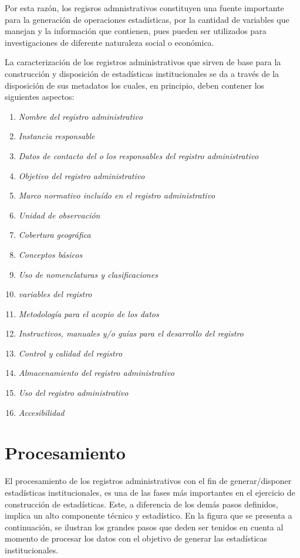 \documentclass[
]{book}
\providecommand{\tightlist}{%
  \setlength{\itemsep}{0pt}\setlength{\parskip}{0pt}}
\begin{document}
Por esta razón, los regisros admnistrativos constituyen una fuente importante para la generación de operaciones estadísticas, por la cantidad de variables que manejan y la información que contienen, pues pueden ser utilizados para investigaciones de diferente naturaleza social o económica.

La caracterización de los registros administrativos que sirven de base para la construcción y disposición de estadísticas institucionales se da a través de la disposición de sus metadatos los cuales, en principio, deben contener los siguientes aspectos:

\begin{enumerate}
\def\labelenumi{\arabic{enumi}.}
\tightlist
\item
  \emph{Nombre del registro administrativo}
\item
  \emph{Instancia responsable}
\item
  \emph{Datos de contacto del o los responsables del registro administrativo}
\item
  \emph{Objetivo del registro administrativo}
\item
  \emph{Marco normativo incluído en el registro administrativo}
\item
  \emph{Unidad de observación}
\item
  \emph{Cobertura geográfica}
\item
  \emph{Conceptos básicos}
\item
  \emph{Uso de nomenclaturas y clasificaciones}
\item
  \emph{variables del registro}
\item
  \emph{Metodología para el acopio de los datos}
\item
  \emph{Instructivos, manuales y/o guías para el desarrollo del registro}
\item
  \emph{Control y calidad del registro}
\item
  \emph{Almacenamiento del registro administrativo}
\item
  \emph{Uso del registro administrativo}
\item
  \emph{Accesibilidad}
\end{enumerate}

\hypertarget{procesamiento}{%
\section{Procesamiento}\label{procesamiento}}

El procesamiento de los registros administrativos con el fin de generar/disponer estadísticas institucionales, es una de las fases más importantes en el ejercicio de construcción de estadísticas. Este, a diferencia de los demás pasos definidos, implica un alto componente técnico y estadístico. En la figura que se presenta a continuación, se ilustran los grandes pasos que deden ser tenidos en cuenta al momento de procesar los datos con el objetivo de generar las estadísticas institucionales.
\end{document}
